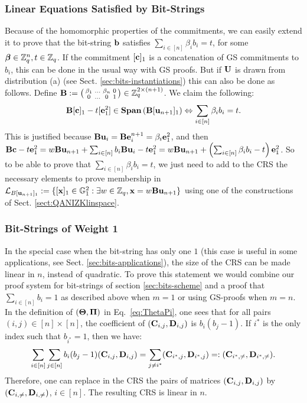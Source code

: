 \subsubsection{Linear Equations Satisfied by Bit-Strings}\label{sec:linear-eqs-bitstrings}
Because of the homomorphic properties of the commitments, 
we can easily extend it to prove that the bit-string $ \mathbf{b}$ satisfies $\sum_{i \in [n]} \beta_i b_i=t$, for some ${\boldsymbol \beta} \in \mathbb{Z}_q^{n}, t\in \mathbb{Z}_q$. 
If the commitment $[\mathbf{c}]_1$ is a concatenation of GS commitments to $b_i$, this can be done in the usual way with GS proofs. 
But if $\mathbf{{U}}$ is drawn from distribution (a) (see Sect. \ref{sec:bits-instantiations})
this can also be done as follows. 
Define $\mathbf{{B}}:=\left(\begin{smallmatrix} \beta_1 & \ldots & \beta_n & 0\\ 0 & \ldots & 0 &1\end{smallmatrix}\right)
\in \mathbb{Z}_q^{2\times (n+1)}$. %
We claim the following:
$$\mathbf{{B}}[\mathbf{c}]_1- t [\mathbf{e}^{2}_{1}] \in \mathbf{Span}\left(\mathbf{{B}}[\mathbf{u}_{n+1}]_1\right) \Leftrightarrow \sum_{i \in [n]}\beta_i  b_i=t.$$
This is justified because
$\mathbf{{B}}\mathbf{u}_i = \mathbf{{B}}\mathbf{e}^{n+1}_i=\beta_i\mathbf{e}_1^{2}$, and then
$ \mathbf{{B}}\mathbf{c}- t \mathbf{e}^{2}_{1}=w  \mathbf{{B}} \mathbf{u}_{n+1}+ \sum_{i \in [n]} b_i \mathbf{{B}} \mathbf{u}_{i} - t \mathbf{e}^{2}_1=w\mathbf{{B}}\mathbf{u}_{n+1}+\left(\sum_{i\in[n]}\beta_i b_i-t\right)\mathbf{e}_1^2$.
So to be able to prove that $\sum_{i \in [n]} \beta_i b_i=t$, we just need to add to the CRS the necessary elements to prove membership 
in $\mathcal{L}_{B[\mathbf{u}_{n+1}]_1}:=\{ [\mathbf{x}]_1 \in \mathbb{G}_1^2: \exists w \in \mathbb{Z}_q,  \mathbf{x} = w\mathbf{{B}}\mathbf{u}_{n+1} \}$ using one of the constructions of Sect. 
\ref{sect:QANIZKlinspace}.

\subsubsection{Bit-Strings of Weight 1}  In the special
case when the bit-string has only one $1$ (this case is useful in some applications, see Sect. \ref{sec:bits-applications}),  the size of the CRS can be made linear in $n$, instead of quadratic.
To prove this statement we would combine our proof system for bit-strings of section \ref{sec:bits-scheme} and a proof that  $\sum_{i \in [n]} b_i=1$ as described above
when $m=1$ or using GS-proofs when $m=n$.
In the definition of $(\mathbf{{\Theta}},\mathbf{{\Pi}})$ in Eq.~\ref{eq:ThetaPi}, one 
sees that for all pairs $(i,j) \in [n] \times [n]$, the coefficient of $(\mathbf{C}_{i,j},\mathbf{D}_{i,j})$ is $b_i(b_j-1)$.
If $i^*$ is the only index such that $b_{i^*}=1$, then we have:
$$\sum_{i \in [n]} \sum_{j \in [n]} b_i(b_j-1) (\mathbf{C}_{i,j},\mathbf{D}_{i,j}) = \sum_{j \neq i^*} (\mathbf{C}_{i^*,j},\mathbf{D}_{i^*,j})=: (\mathbf{C}_{i^*,\neq},\mathbf{D}_{i^*,\neq}).$$
Therefore, one can replace in the CRS the pairs of matrices  $ (\mathbf{C}_{i,j},\mathbf{D}_{i,j})$ by  $(\mathbf{C}_{i,\neq},\mathbf{D}_{i,\neq})$, $i \in [n]$. The resulting CRS is linear in $n$.

